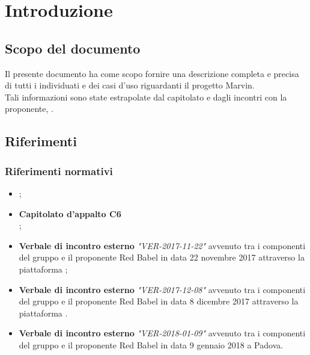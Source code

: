 \documentclass[AnalisiDeiRequisiti.tex]{subfiles}
\begin{document}
\chapter{Introduzione}
\section{Scopo del documento}
Il presente documento ha come scopo fornire una descrizione completa e precisa di tutti i  individuati e dei casi d'uso riguardanti il progetto Marvin.\\
Tali informazioni sono state estrapolate dal capitolato e dagli incontri con la proponente, \Proponente.

\scopoProdotto

\glossExpl

\section{Riferimenti}

\subsection{Riferimenti normativi}

\begin{itemize}
	\item \textbf{\ndp \vrquattro};
	\item \textbf{Capitolato d'appalto C6}\\ ;
	\item \textbf{Verbale di incontro esterno} \textit{"VER-2017-11-22"} avvenuto tra i componenti del gruppo e il proponente Red Babel in data 22 novembre 2017 attraverso la piattaforma ;
	\item \textbf{Verbale di incontro esterno} \textit{"VER-2017-12-08"} avvenuto tra i componenti del gruppo e il proponente Red Babel in data 8 dicembre 2017 attraverso la piattaforma .
	\item \textbf{Verbale di incontro esterno} \textit{"VER-2018-01-09"} avvenuto tra i componenti del gruppo e il proponente Red Babel in data 9 gennaio 2018 a Padova.
	
\end{itemize}
\end{document}

